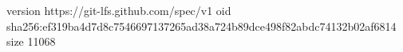 version https://git-lfs.github.com/spec/v1
oid sha256:ef319ba4d7d8c7546697137265ad38a724b89dce498f82abdc74132b02af6814
size 11068
